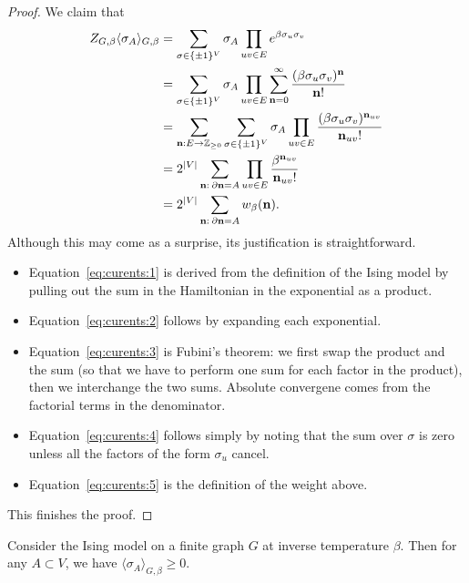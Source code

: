 \begin{proof}
    We claim that
    \begin{align}
        \label{eq:curents:1}
        Z_{G,\beta}\langle\sigma_A\rangle_{G,\beta}
        &=
        \sum_{\sigma\in\{\pm1\}^V}
        \sigma_A
        \prod_{uv\in E}
        e^{\beta\sigma_u\sigma_v}
        \\
        \label{eq:curents:2}
        &=
        \sum_{\sigma\in\{\pm1\}^V}
        \sigma_A
        \prod_{uv\in E}
        \sum_{\n=0}^\infty
        \frac{(\beta\sigma_u\sigma_v)^\n}{\n!}
        \\
        \label{eq:curents:3}
        &=
        \sum_{\n:E\to\Z_{\geq 0}}
        \sum_{\sigma\in\{\pm1\}^V}
        \sigma_A
        \prod_{uv\in E}
        \frac{(\beta\sigma_u\sigma_v)^{\n_{uv}}}{\n_{uv}!}
        \\
        \label{eq:curents:4}
        &=
        2^{|V|}\sum_{\n:\:\partial\n=A}
        \prod_{uv\in E}
        \frac{\beta^{\n_{uv}}}{\n_{uv}!}
        \\
        \label{eq:curents:5}
        &=
        2^{|V|}
        \sum_{\n:\:\partial\n=A}
        w_\beta(\n).
    \end{align}
    Although this may come as a surprise, its justification is straightforward.
    \begin{itemize}
        \item Equation~\eqref{eq:curents:1} is derived from the definition
        of the Ising model by pulling out the sum in the Hamiltonian in
        the exponential as a product.
        \item Equation~\eqref{eq:curents:2} follows by expanding each exponential.
        \item Equation~\eqref{eq:curents:3} is Fubini's theorem:
        we first swap the product and the sum (so that we have to perform one sum for each
        factor in the product), then we interchange the two sums.
        Absolute convergene comes from the factorial terms in the denominator.
        \item Equation~\eqref{eq:curents:4} follows simply by noting that the sum over $\sigma$ is zero unless
        all the factors of the form $\sigma_u$ cancel.
        \item Equation~\eqref{eq:curents:5} is the definition of the weight above.
    \end{itemize}
    This finishes the proof.
\end{proof}

\begin{corollary}
    \label{cor:griffiths_1}
    Consider the Ising model on a finite graph $G$ at inverse temperature $\beta$.
    Then for any $A\subset V$, we have $\langle\sigma_A\rangle_{G,\beta}\geq 0$.
\end{corollary}

